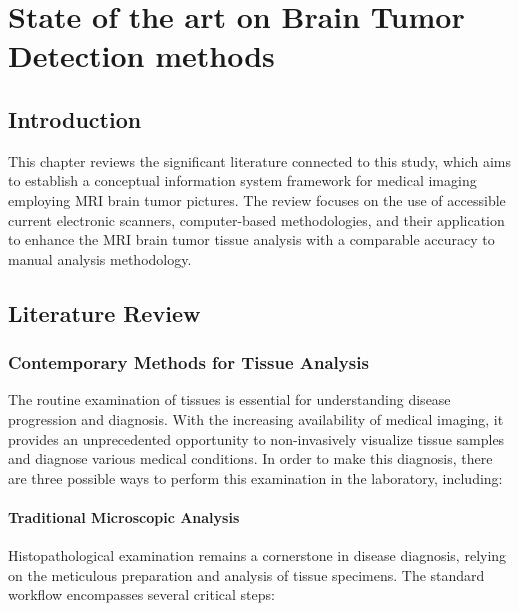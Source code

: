 \chapter{State of the art on Brain Tumor Detection methods}

\section{Introduction}
This chapter reviews the significant literature connected to this study,
which aims to establish a conceptual information system framework for
medical imaging employing MRI brain tumor pictures. The review focuses on
the use of accessible current electronic scanners, computer-based
methodologies, and their application to enhance the MRI brain tumor tissue
analysis with a comparable accuracy to manual analysis methodology.
\section{Literature Review}
\subsection{Contemporary Methods for Tissue Analysis}
The routine examination of tissues is essential for understanding disease progression and diagnosis. With the increasing availability of medical imaging, it provides an unprecedented opportunity to non-invasively visualize tissue samples and diagnose various medical conditions. In order to make this diagnosis, there are three possible ways to perform this examination in the laboratory, including:

\subsubsection{Traditional Microscopic Analysis}

Histopathological examination remains a cornerstone in disease diagnosis, relying on the meticulous preparation and analysis of tissue specimens. The standard workflow encompasses several critical steps:

